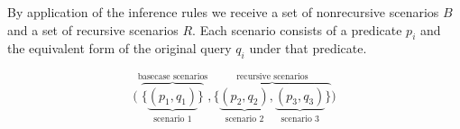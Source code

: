 

By application of the inference rules we receive a set of nonrecursive scenarios $B$ and a set of recursive scenarios $R$. Each scenario consists of a predicate $p_i$ and the equivalent form of the original query $q_i$ under that predicate.

$$
\Big(
    \overbrace{\big\{
        \underbrace{
            (p_1, q_1)
        }_{\text{scenario 1}}
    \big\}}^{\text{basecase scenarios}}
    ,
    \overbrace{\big\{
        \underbrace{
            (p_2, q_2)
        }_{\text{scenario 2}},
        \underbrace{
            (p_3, q_3)
        }_{\text{scenario 3}}
    \big\}}^{\text{recursive scenarios}}
\Big)
$$


